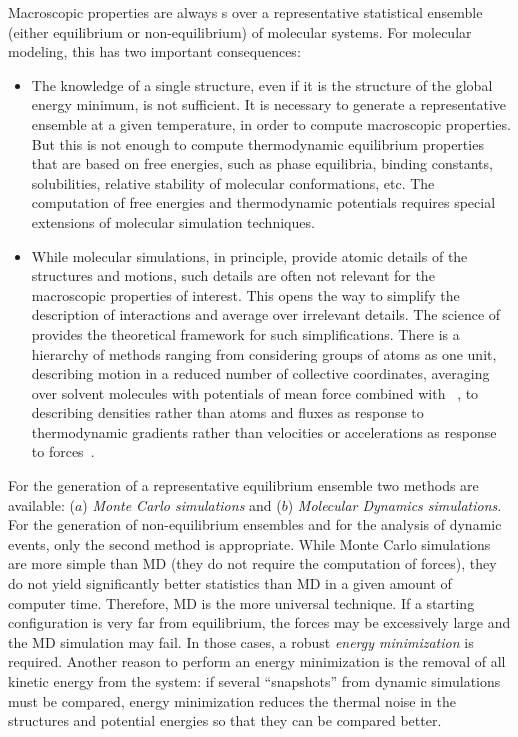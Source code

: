 Macroscopic properties are always s over a 
representative statistical ensemble (either equilibrium or 
non-equilibrium) of molecular systems. For molecular modeling, this has 
two important consequences:
\begin{itemize}
\item   The knowledge of a single structure, even if it is the structure 
        of the global energy minimum, is not sufficient. It is necessary to 
        generate a representative ensemble at a given temperature, in order to 
        compute macroscopic properties. But this is not enough to compute 
        thermodynamic equilibrium properties that are based on free energies, 
        such as phase equilibria, binding constants, solubilities,  relative 
        stability of molecular conformations, etc. The computation of free 
        energies and thermodynamic potentials requires special extensions of 
        molecular simulation techniques.
\item   While molecular simulations, in principle, provide atomic details 
        of the structures and motions, such details are often not relevant for 
        the macroscopic properties of interest. This opens the way to simplify 
        the description of interactions and average over irrelevant details. 
        The science of  
        provides the theoretical framework 
        for such simplifications. There is a hierarchy of methods ranging from 
        considering groups of atoms as one unit, describing motion in a 
        reduced 
        number of collective coordinates, averaging over solvent molecules 
        with 
        potentials of mean force combined with 
        ~\cite{Gunsteren90}, to {\em 
        } 
        describing densities rather than atoms and fluxes 
        as response to thermodynamic gradients rather than velocities or 
        accelerations as response to forces~\cite{Fraaije93}.
\end{itemize}

For the generation of a representative equilibrium ensemble two methods 
are available: ($a$) {\em Monte Carlo simulations} and ($b$) {\em Molecular 
Dynamics simulations}. For the generation of non-equilibrium ensembles 
and for the analysis of dynamic events, only the second method is 
appropriate. While Monte Carlo simulations are more simple than MD (they 
do not require the computation of forces), they do not yield 
significantly better statistics than MD in a given amount of computer time. 
Therefore, MD is the more universal technique. If a starting 
configuration is very far from equilibrium, the forces may be 
excessively large and the MD simulation may fail. In those cases, a 
robust {\em energy minimization} is required. Another reason to perform 
an energy minimization is the removal of all kinetic energy from the 
system: if several ``snapshots'' from dynamic simulations must be compared, 
energy minimization reduces the thermal noise in the structures and  
potential energies so that they can be compared better.

